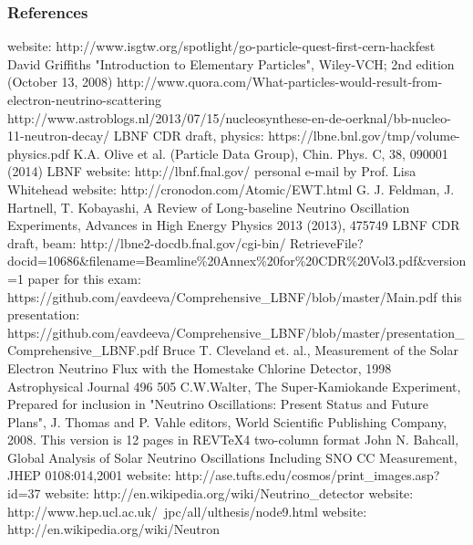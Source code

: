 \begin{frame}[allowframebreaks]\frametitle{References}
\tiny
\begin{thebibliography}{1}
    website: http://www.isgtw.org/spotlight/go-particle-quest-first-cern-hackfest
    David Griffiths "Introduction to Elementary Particles", Wiley-VCH; 2nd edition (October 13, 2008)
   http://www.quora.com/What-particles-would-result-from-electron-neutrino-scattering
    http://www.astroblogs.nl/2013/07/15/nucleosynthese-en-de-oerknal/bb-nucleo-11-neutron-decay/
    LBNF CDR draft, physics: https://lbne.bnl.gov/tmp/volume-physics.pdf
    K.A. Olive et al. (Particle Data Group), Chin. Phys. C, 38, 090001 (2014) 
    LBNF website: http://lbnf.fnal.gov/
    personal e-mail by Prof. Lisa Whitehead
    website: http://cronodon.com/Atomic/EWT.html
    G. J. Feldman, J. Hartnell, T. Kobayashi, A Review of Long-baseline Neutrino Oscillation Experiments, Advances in High Energy Physics 2013 (2013), 475749
    LBNF CDR draft, beam: http://lbne2-docdb.fnal.gov/cgi-bin/ RetrieveFile?docid=10686\&filename=Beamline\%20Annex\%20for\%20CDR\%20Vol3.pdf\&version=1
    paper for this exam: https://github.com/eavdeeva/Comprehensive\_LBNF/blob/master/Main.pdf
    this presentation: https://github.com/eavdeeva/Comprehensive\_LBNF/blob/master/presentation\_Comprehensive\_LBNF.pdf
    Bruce T. Cleveland et. al., Measurement of the Solar Electron Neutrino Flux with the Homestake Chlorine Detector, 1998 Astrophysical Journal 496 505
    C.W.Walter, The Super-Kamiokande Experiment, Prepared for inclusion in "Neutrino Oscillations: Present Status and Future Plans", J. Thomas and P. Vahle editors, World Scientific Publishing Company, 2008. This version is 12 pages in REVTeX4 two-column format
    John N. Bahcall, Global Analysis of Solar Neutrino Oscillations Including SNO CC Measurement, JHEP 0108:014,2001
    website: http://ase.tufts.edu/cosmos/print\_images.asp?id=37
    website: http://en.wikipedia.org/wiki/Neutrino\_detector
    website: http://www.hep.ucl.ac.uk/~jpc/all/ulthesis/node9.html
    website: http://en.wikipedia.org/wiki/Neutron

\end{thebibliography}
\end{frame}
